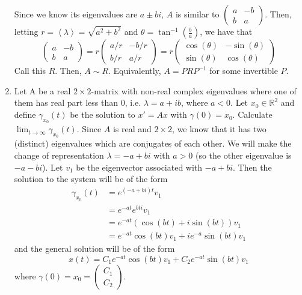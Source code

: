 \documentclass[12pt]{article}
\newcommand{\R}{\mathbb{R}}
\newcommand{\abs}[1]{\left\langle #1 \right\rangle}
\begin{document}
\begin{enumerate}
        Since we know its eigenvalues are $a \pm bi$, $A$ is similar to $\begin{pmatrix}
            a & -b\\ 
            b & a
        \end{pmatrix}$. Then, letting $r = \abs{\lambda} = \sqrt{a^2 + b^2}$ and $\theta = \tan^{-1}(\frac{b}{a})$, we have that
        \[\begin{pmatrix}
            a & -b\\ 
            b & a
        \end{pmatrix} = r\begin{pmatrix}
            a/r & -b/r\\ 
            b/r & a/r
        \end{pmatrix} = r\begin{pmatrix}
            \cos(\theta) & -\sin(\theta)\\ 
            \sin(\theta) & \cos(\theta)
        \end{pmatrix}\]
        Call this $R$. Then, $A \sim R$. Equivalently, $A = PRP^{-1}$ for some invertible $P$. 
    
    \color{black}

\pagebreak
\item Let A be a real $2\times 2$-matrix with non-real complex eigenvalues where one of them has real part less than $0$, i.e. $\lambda = a + ib$, where $a < 0$. Let $x_0 \in \R^2$ and define $\gamma_{x_0}(t)$ be the solution to $x' = Ax$ with $\gamma(0) = x_0$. Calculate $\lim_{t \to \infty} \gamma_{x_0}(t)$.
    \color{blue}
        Since $A$ is real and $2 \times 2$, we know that it has two (distinct) eigenvalues which are conjugates of each other. We will make the change of representation $\lambda = -a + bi$ with $a > 0$ (so the other eigenvalue is $-a - bi$). Let $v_1$ be the eigenvector associated with $-a + bi$. Then the solution to the system will be of the form 
        \begin{align*}
            \gamma_{x_0}(t) &= e^{(-a + bi)t} v_1\\ 
                &= e^{-at}e^{bti}v_1\\
                &= e^{-at}(\cos(bt) + i\sin(bt))v_1\\ 
                &= e^{-at} \cos(bt) v_1 + ie^{-a}\sin(bt)v_1
        \end{align*}
        and the general solution will be of the form 
        \[x(t) = C_1e^{-at}\cos(bt) v_1 + C_2e^{-at}\sin(bt)v_1\]
        where $\gamma(0) = x_0 = \begin{pmatrix}
            C_1\\ C_2
        \end{pmatrix}$. 


\end{enumerate}
\end{document}

